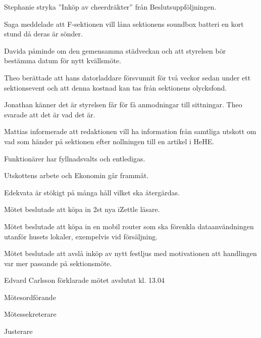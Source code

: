 \documentclass[10pt]{article}
\def\mo{Edvard Carlsson}
\def\ms{Mattias Lundström}
\def\ji{Jakob Pettersson}
\begin{document}
\begin{paragrafer}
Stephanie \ypa stryka ''Inköp av cheerdräkter'' från Beslutsuppföljningen.

\Mbaby


Saga meddelade att F-sektionen vill låna sektionens soundbox batteri en kort stund då deras är sönder. 

Davida påminde om den gemensamma städveckan och att styrelsen bör bestämma datum för nytt kvällsmöte.

Theo berättade att hans datorladdare försvunnit för två veckor sedan under ett sektionsevent och att denna kostnad kan tas från sektionens olycksfond. 

Jonathan känner det är styrelsen får för få anmodningar till sittningar. Theo svarade att det är vad det är. 

Mattias informerade att redaktionen vill ha information från samtliga utskott om vad som händer på sektionen efter nollningen till en artikel i HeHE.

Funktionärer har fyllnadsvalts och entledigas.

Utskottens arbete och Ekonomin går frammåt. 

Edekvata är stökigt på många håll vilket ska återgärdas. 

Mötet beslutade att köpa in 2st nya iZettle läsare.

Mötet beslutade att köpa in en mobil router som ska förenkla dataanvändningen utanför husets lokaler, exempelvis vid försäljning. 

Mötet beslutade att avslå inköp av nytt festljus med motivationen att handlingen var mer passande på sektionsmöte.    

{\mo} förklarade mötet avslutat kl. 13.04
\end{paragrafer}

\hidesignfoot
\begin{signatures}{3}
\signature{\mo}{Mötesordförande}
\signature{\ms}{Mötessekreterare}
\signature{\ji}{Justerare}
\end{signatures}
\end{document}
